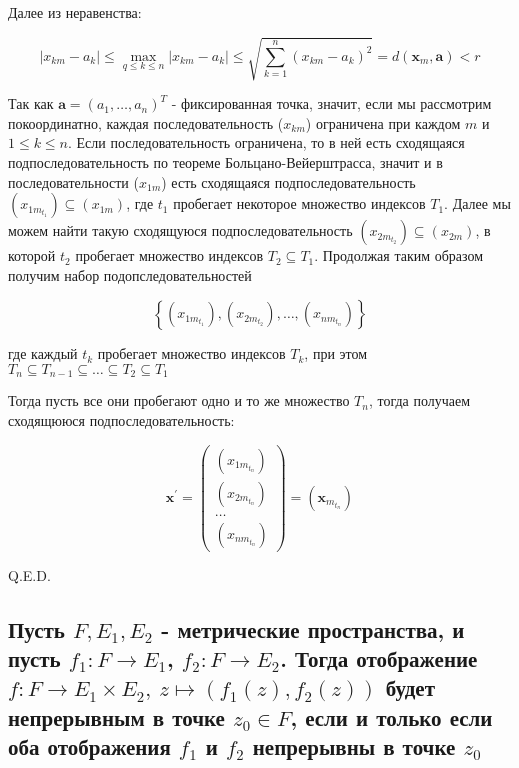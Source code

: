 \documentclass[a4paper]{article}
\begin{document}
Далее из неравенства:

$$
\left|x_{k m}-a_{k}\right| \leqslant \max _{q \leqslant k \leqslant n}\left|x_{k m}-a_{k}\right| \leqslant \sqrt{\sum_{k=1}^{n}\left(x_{k m}-a_{k}\right)^{2}}=d\left(\mathbf{x}_{m}, \mathbf{a}\right)<r
$$

Так как $\mathbf{a}=\left(a_{1}, \ldots, a_{n}\right)^{T}$ - фиксированная точка, значит, если мы рассмотрим покоординатно, каждая последовательность ($x_{k m}$) ограничена при каждом $m$ и $1 \leqslant k \leqslant n$. Если последовательность ограничена, то в ней есть сходящаяся подпоследовательность по теореме Больцано-Вейерштрасса, значит и в последовательности ($x_{1 m}$) есть сходящаяся подпоследовательность $\left(x_{1 m_{t_{1}}}\right) \subseteq\left(x_{1 m}\right)$, где $t_{1}$ пробегает некоторое множество индексов $T_{1}$. Далее мы можем найти такую сходящуюся подпоследовательность $\left(x_{2 m_{t_{2}}}\right) \subseteq\left(x_{2 m}\right)$, в которой $t_{2}$ пробегает множество индексов $T_{2} \subseteq T_{1}$. Продолжая таким образом получим набор подопследовательностей

$$
\left\{\left(x_{1 m_{t_{1}}}\right),\left(x_{2 m_{t_{2}}}\right), \ldots,\left(x_{n m_{t_{n}}}\right)\right\}
$$

где каждый $t_{k}$ пробегает множество индексов $T_{k}$, при этом $T_{n} \subseteq T_{n-1} \subseteq \ldots \subseteq T_{2} \subseteq T_{1}$

Тогда пусть все они пробегают одно и то же множество $T_{n}$, тогда получаем сходящююся подпоследовательность:

$$
\mathbf{x}^{\prime}=\left(\begin{array}{c}
\left(x_{1 m_{t_{n}}}\right) \\
\left(x_{2 m_{t_{n}}}\right) \\
\ldots \\
\left(x_{n m_{t_{n}}}\right)
\end{array}\right)=\left(\mathbf{x}_{m_{t_{n}}}\right)
$$

Q.E.D.

\subsection{Пусть $F, E_{1}, E_{2}$ - метрические пространства, и пусть $f_{1}: F \rightarrow E_{1}$, $f_{2}: F \rightarrow E_{2}$. Тогда отображение $f: F \rightarrow E_{1} \times E_{2},\ z \mapsto\left(f_{1}(z), f_{2}(z)\right)$ будет непрерывным в точке $z_{0} \in F$, если и только если оба отображения $f_{1}$ и $f_{2}$ непрерывны в точке $z_{0}$}
\end{document}
